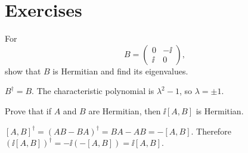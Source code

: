 \section*{Exercises}

\begin{exercise}
For
\[
  B=\begin{pmatrix}0&-\ii\\ \ii&0\end{pmatrix},
\]
show that \(B\) is Hermitian and find its eigenvalues.
\begin{answer}
\(B^\dagger=B\).  The characteristic polynomial is \(\lambda^2-1\), so \(\lambda=\pm1\).
\end{answer}
\end{exercise}

\begin{exercise}
Prove that if \(A\) and \(B\) are Hermitian, then \(\ii[A,B]\) is Hermitian.
\begin{answer}
\([A,B]^\dagger=(AB-BA)^\dagger=BA-AB=-[A,B]\).  Therefore \((\ii[A,B])^\dagger=-\ii(-[A,B])=\ii[A,B]\).
\end{answer}
\end{exercise}
